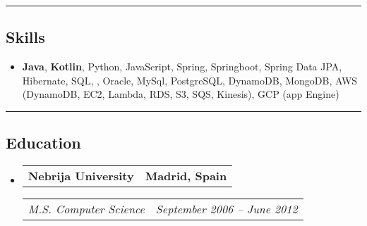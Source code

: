 \documentclass[11pt,letterpaper]{article}
\makeatletter
\newcommand{\headerrow}[2]
{\begin{tabular*}{\linewidth}{l@{\extracolsep{\fill}}r}
#1 &
#2 \\
\end{tabular*}}
\makeatother
\begin{document}
\hrule
\vspace{-1em}
\subsection*{\Large Skills}
\begin{itemize}[leftmargin=1em,noitemsep]
	\item \textbf{Java}, \textbf{Kotlin}, Python, JavaScript, Spring, Springboot, Spring Data JPA, Hibernate, SQL, \LaTex, Oracle, MySql, PostgreSQL, DynamoDB, MongoDB, AWS (DynamoDB, EC2, Lambda, RDS, S3, SQS, Kinesis), GCP (app Engine)
\end{itemize}

\hrule
\vspace{-1em}
\subsection*{\Large Education}

\begin{itemize}[leftmargin=1em]
	\parskip=0.1em
		
	\item
	      \headerrow
	      {\textbf{Nebrija University}}
	      {\textbf{Madrid, Spain}}
	      \headerrow
	      {\emph{M.S. Computer Science}}
	      {\emph{September 2006 -- June 2012}}
	      	      
\end{itemize}
\end{document}
